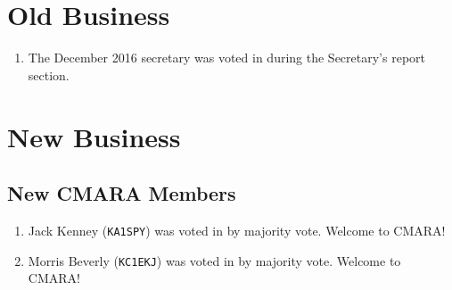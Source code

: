 \documentclass[10pt,letterpaper]{article}
\begin{document}
\section{Old Business}
\begin{enumerate}
  \item The December 2016 secretary was voted in during the Secretary's report section.
\end{enumerate}

\section{New Business}

\subsection{New CMARA Members}
\label{new-cmara-members}
\begin{enumerate}
  \item Jack Kenney (\texttt{KA1SPY}) was voted in by majority vote. Welcome to CMARA!
  \item Morris Beverly (\texttt{KC1EKJ}) was voted in by majority vote. Welcome to CMARA!
\end{enumerate}
\end{document}
